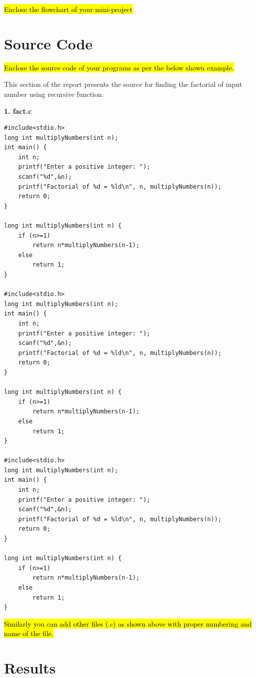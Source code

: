 \documentclass[12pt]{article}
\begin{document}
\hl{Enclose the flowchart of your mini-project}

\newpage                            %
\section{Source Code}               %

\hl{Enclose the source code of your programs as per the below shown example.}

This section of the report presents the source for finding the factorial of input number using recursive function.

\noindent \textbf{1. fact.c}


\begin{lstlisting} 
#include<stdio.h>
long int multiplyNumbers(int n);
int main() {
    int n;
    printf("Enter a positive integer: ");
    scanf("%d",&n);
    printf("Factorial of %d = %ld\n", n, multiplyNumbers(n));
    return 0;
}

long int multiplyNumbers(int n) {
    if (n>=1)
        return n*multiplyNumbers(n-1);
    else
        return 1;
}

#include<stdio.h>
long int multiplyNumbers(int n);
int main() {
    int n;
    printf("Enter a positive integer: ");
    scanf("%d",&n);
    printf("Factorial of %d = %ld\n", n, multiplyNumbers(n));
    return 0;
}

long int multiplyNumbers(int n) {
    if (n>=1)
        return n*multiplyNumbers(n-1);
    else
        return 1;
}

#include<stdio.h>
long int multiplyNumbers(int n);
int main() {
    int n;
    printf("Enter a positive integer: ");
    scanf("%d",&n);
    printf("Factorial of %d = %ld\n", n, multiplyNumbers(n));
    return 0;
}

long int multiplyNumbers(int n) {
    if (n>=1)
        return n*multiplyNumbers(n-1);
    else
        return 1;
}
\end{lstlisting}

\hl{Similarly you can add other files (.c) as shown above with proper numbering and name of the file.}

\newpage            %
\section{Results}   %
\end{document}

